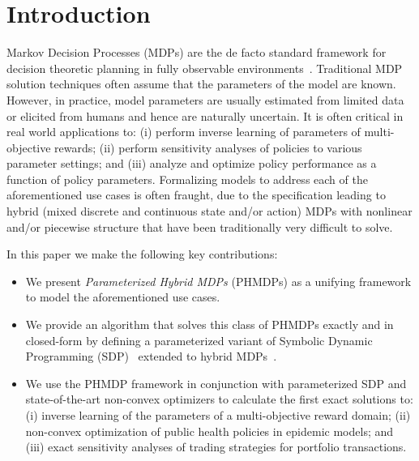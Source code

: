 \section{Introduction}
\label{sec:introduction}

Markov Decision Processes (MDPs)
are the de facto standard framework for decision theoretic planning in fully observable environments~\cite{Boutilier_JAIR_1999}. 
Traditional MDP solution techniques often assume that the parameters of the model are known. However, in practice, model parameters are usually estimated from limited data or elicited from humans and hence are naturally uncertain. It is often critical in real world applications to: (i) perform inverse learning of parameters of multi-objective rewards; (ii) perform sensitivity analyses of policies to various parameter settings; and (iii) analyze and optimize policy performance as a function of policy parameters. Formalizing models to address each of the aforementioned use cases is often fraught, due to the specification leading to hybrid (mixed discrete and continuous state and/or action) MDPs with nonlinear and/or piecewise structure that have been traditionally very difficult to solve.

In this paper we make the following key contributions:
\begin{itemize}
\item We present {\it Parameterized Hybrid MDPs} (PHMDPs) as a unifying framework to model the aforementioned use cases.
\item We provide an algorithm that solves this class of PHMDPs exactly and in closed-form by defining a parameterized variant of Symbolic Dynamic Programming (SDP)~\cite{Boutilier_IJCAI_2001} extended to hybrid MDPs~\cite{Sanner_UAI_2011}. 
\item We use the PHMDP framework in conjunction with parameterized SDP and state-of-the-art non-convex optimizers to calculate the first exact solutions to: (i) inverse learning of the parameters of a multi-objective reward domain; (ii) non-convex optimization of public health policies in epidemic models; and (iii) exact sensitivity analyses of trading strategies for portfolio transactions. 
\end{itemize}

